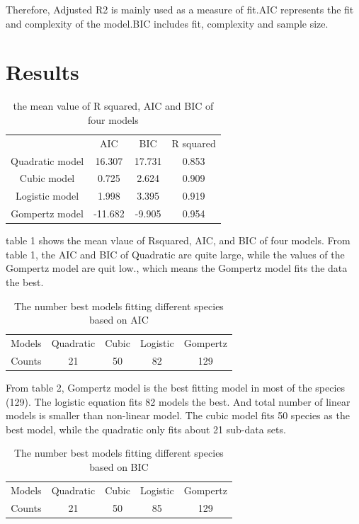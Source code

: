 \documentclass{article}
\begin{document}
Therefore, Adjusted R2 is mainly used as a measure of fit.AIC represents the fit and complexity of the model.BIC includes fit, complexity and sample size.

\section{Results}
\begin{table}
    \centering
    \begin{tabular}{cccc}
         &  AIC&  BIC& R squared\\
         Quadratic model&  16.307&  17.731& 0.853\\
         Cubic model&  0.725&  2.624& 0.909\\
         Logistic model&  1.998&  3.395& 0.919\\
         Gompertz model&  -11.682&  -9.905& 0.954\\
    \end{tabular}
    \caption{the mean value of R squared, AIC and BIC of four models}
    \label{tab:my_label}
\end{table}

table 1 shows the mean vlaue of Rsquared, AIC, and BIC of four models. From table 1, the AIC and BIC of  Quadratic are quite large, while the values of the Gompertz model are quit low., which means the Gompertz model fits the data the best.
\begin{table}
    \centering
    \begin{tabular}{ccccc}
         Models&  Quadratic&  Cubic&  Logistic& Gompertz\\
         Counts&  21&  50&  82& 129\\
    \end{tabular}
    \caption{The number best models fitting different species based on AIC}
    \label{tab:my_label}
\end{table}

From table 2, Gompertz model is the best fitting model in most of the species (129). The logistic equation fits 82 models the best. And total number of linear models is smaller than non-linear model. The cubic model fits 50 species as the best model, while the quadratic only fits about 21 sub-data sets.
\begin{table}
    \centering
    \begin{tabular}{ccccc}
         Models&  Quadratic&  Cubic&  Logistic& Gompertz\\
         Counts&  21&  50&  85& 129\\
    \end{tabular}
    \caption{The number best models fitting different species based on BIC}
    \label{tab:my_label}
\end{table}
\end{document}
